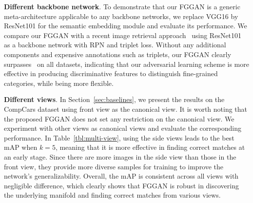 \documentclass[runningheads]{llncs}
\begin{document}
\begin{comment}
\begin{table*}[t]
\renewcommand{\arraystretch}{0.95}
	\centering
    \vspace{-2mm}
    \footnotesize
	\caption{Performance comparison (mAP, \%) of using ResNet101 as the backbone network.}
	\label{tbl:map-compare-resnet}
    \vspace{-2mm}{
	\begin{tabular*}{\textwidth}{@{}@{\extracolsep{\fill}}lcccc|cccc|ccc@{}}
	& \multicolumn{3}{c}{CompCars} && \multicolumn{3}{c}{eBayCamera10k} && \multicolumn{3}{c}{Lookbook} \\
	\hline
	Method  & $k = 5$ &  $k = 10$ & $k = 20$ && $k = 5$ &  $k = 10$ & $k = 20$ && $k = 5$ &  $k = 10$ & $k = 20$\\ 
    \hline
    ResNet101~\cite{he2016deep} & $59.54$ & $55.87$ & $49.82$ && $83.61$ & $80.82$ & $77.85$ && $65.74$ & $62.27$ & $57.80$\\
    RPN$+$TripletLoss~\cite{gordo2017end} & $78.65$ & $73.32$ & $65.52$ && $86.44$ & $83.30$ & $78.88$ && $71.89$ & $68.96$ & $65.58$\\
	FGGAN$_{ResNet101}$& $\textbf{81.99}$ & $\textbf{76.65}$ & $\textbf{68.83}$ && $\textbf{95.68}$ & $\textbf{94.89}$ & $\textbf{94.06}$ && $\textbf{87.68}$ & $\textbf{83.02}$ & $\textbf{78.63}$\\
	\hline
	\end{tabular*}
    }
\end{table*}
\end{comment}{\flushleft \textbf{Different backbone network}.} To demonstrate that our FGGAN is a generic meta-architecture applicable to any backbone networks, we replace VGG16 by ResNet101 for the semantic embedding module and evaluate its performance. We compare our FGGAN with a recent image retrieval approach~\cite{gordo2017end} using ResNet101 as a backbone network with RPN and triplet loss. Without any additional components and expensive annotations such as triplets, our FGGAN clearly surpasses~\cite{gordo2017end} on all datasets, indicating that our adversarial learning scheme is more effective in producing discriminative features to distinguish fine-grained categories, while being more flexible. 

{\flushleft \textbf{Different views}.} In Section~\ref{sec:baselines}, we present the results on the CompCars dataset using front view as the canonical view. 
It is worth noting that the proposed FGGAN does not set any restriction on the canonical view. 
We experiment with other views as canonical views and evaluate the corresponding performance. 
In Table~\ref{tbl:multi-view}, using the side views leads to the best mAP when $k=5$, meaning that it is more effective in finding correct matches at an early stage.
Since there are more images in the side view than those in the front view, they provide more diverse samples for training to improve the network's generalizability.
Overall, the mAP is consistent across all views with negligible difference, which clearly shows that FGGAN is robust in discovering the underlying manifold and finding correct matches from various views. 
\end{document}

